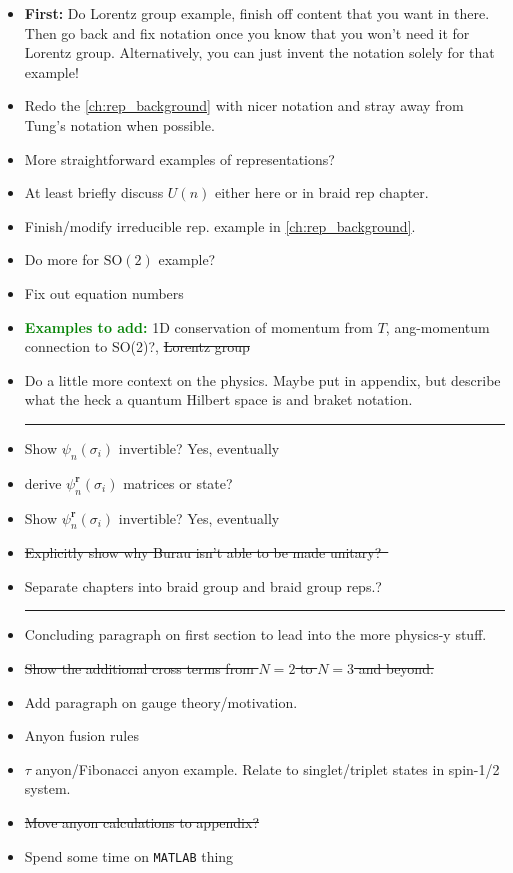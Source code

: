 \begin{itemize}

    \item \textbf{First:} Do Lorentz group example, finish off content that you want in there. Then go back and fix notation once you know that you won't need it for Lorentz group. Alternatively, you can just invent the notation solely for that example!
    \item Redo the \cref{ch:rep_background} with nicer notation and stray away from Tung's notation when possible.
    \item More straightforward examples of representations?
    \item At least briefly discuss $U(n)$ either here or in braid rep chapter.
    \item Finish/modify irreducible rep. example in \cref{ch:rep_background}.
    \item Do more for $\textrm{SO}(2)$ example?
    \item Fix out equation numbers
    \item \textcolor{Green}{\textbf{Examples to add:}} 1D conservation of momentum from $T$, ang-momentum connection to SO(2)?, \sout{Lorentz group}
    \item Do a little more context on the physics. Maybe put in appendix, but describe what the heck a quantum Hilbert space is and braket notation.
    
    \begin{center}\rule{.85\textwidth}{0.65pt}\end{center}
    
    \item Show $\psi_n(\sigma_i)$ invertible? Yes, eventually
    \item derive $\psi_n^\textbf{r}(\sigma_i)$ matrices or state?
    \item Show $\psi_n^\textbf{r}(\sigma_i)$ invertible? Yes, eventually
    \item \sout{Explicitly show why Burau isn't able to be made unitary?~\cite{Delaney2016}}
    \item Separate chapters into braid group and braid group reps.?
    
    \begin{center}\rule{.85\textwidth}{0.65pt}\end{center}
    
    \item Concluding paragraph on first section to lead into the more physics-y stuff.
    \item \sout{Show the additional cross terms from $N=2$ to $N=3$ and beyond.}
    \item Add paragraph on gauge theory/motivation.
    \item Anyon fusion rules
    \item $\tau$ anyon/Fibonacci anyon example. Relate to singlet/triplet states in spin-1/2 system.
    \item \sout{Move anyon calculations to appendix?}
    \item Spend some time on \texttt{MATLAB} thing


\end{itemize}
